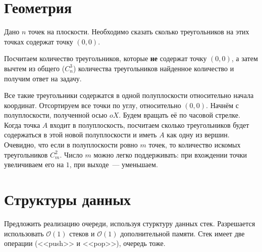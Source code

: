 \documentclass[addpoints]{exam}
\begin{document}
\begin{questions}
\section{Геометрия}

\question Дано $n$ точек на плоскости. Необходимо сказать сколько треугольников на этих точках содержат точку $(0,0)$. 


\begin{solution}

Посчитаем количество треугольников, которые \textbf{не} содержат точку $(0,0)$, а затем вычтем из общего ($C_n^3$) количества треугольников найденное количество и получим ответ на задачу.

Все такие треугольники содержатся в одной полуплоскости относительно начала координат. Отсортируем все точки по углу, относительно $(0,0)$. Начнём с полуплоскости, полученной осью $oX$. Будем вращать её по часовой стрелке. Когда точка $A$ входит в полуплоскость, посчитаем сколько треугольников будет содержаться в этой новой полуплоскости и иметь $A$ как одну из вершин. Очевидно, что если в полуплоскости ровно $m$ точек, то количество искомых треугольников $C_m^2$. Число $m$ можно легко поддерживать: при вхождении точки увеличиваем его на $1$, при выходе~--- уменьшаем.

\end{solution}


\section{Структуры данных}

\question Предложить реализацию очереди, используя стурктуру данных стек. Разрешается использовать $\mathcal{O}(1)$ стеков и $\mathcal{O}(1)$ дополнительной памяти. Стек имеет две операции (<<push>> и <<pop>>), очередь тоже.


\end{questions}
\end{document}
